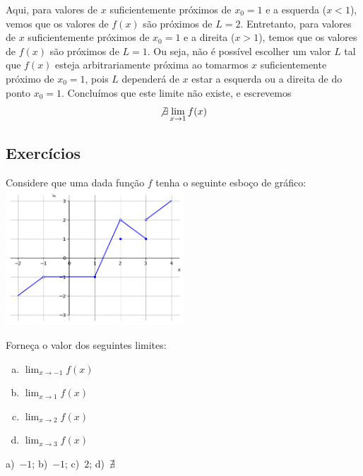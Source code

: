 \cleardoublepage\documentclass[../main.tex]{subfiles}
\begin{document}
\begin{exeresol}
\begin{resol}
\begin{enumerate}[a)]
      Aqui, para valores de $x$ suficientemente próximos de $x_0=1$ e a esquerda ($x<1$), vemos que os valores de $f(x)$ são próximos de $L=2$. Entretanto, para valores de $x$ suficientemente próximos de $x_0=1$ e a direita ($x>1$), temos que os valores de $f(x)$ são próximos de $L=1$. Ou seja, não é possível escolher um valor $L$ tal que $f(x)$ esteja arbitrariamente próxima ao tomarmos $x$ suficientemente próximo de $x_0=1$, pois $L$ dependerá de $x$ estar a esquerda ou a direita de do ponto $x_0 = 1$. Concluímos que este limite não existe, e escrevemos
      \begin{equation*}
        \not\exists\lim_{x\to 1} f(x)
      \end{equation*}
  \end{enumerate}
\end{resol}
\end{exeresol}

\subsection{Exercícios}
\begin{exer}\label{exer:limgraf}
  Considere que uma dada função $f$ tenha o seguinte esboço de gráfico:
  \includegraphics[width=0.5\textwidth]{fig_lim/fig_exer_limgraf}

  Forneça o valor dos seguintes limites:
  \begin{multicols}{2}
    \begin{enumerate}[a)]
  \item $\displaystyle \lim_{x\to -1} f(x)$
  \item $\displaystyle \lim_{x\to 1} f(x)$
  \item $\displaystyle \lim_{x\to 2} f(x)$
  \item $\displaystyle \lim_{x\to 3} f(x)$
  \end{enumerate}\end{multicols}
\end{exer}
\begin{resp}
  a)~$-1$; b)~$-1$; c)~$2$; d)~$\nexists$
\end{resp}
\end{document}
